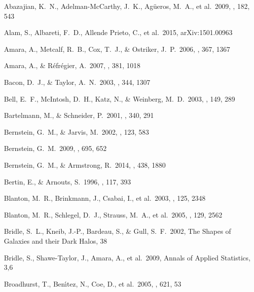 \documentclass[apj]{emulateapj}
\begin{document}
\begin{thebibliography}{}

  Abazajian, K.~N.,
 Adelman-McCarthy, J.~K., Ag{\"u}eros, M.~A., et al.\ 2009, \apjs, 182, 543

 Alam, S., Albareti, F.~D.,
Allende Prieto, C., et al.\ 2015, arXiv:1501.00963

  Amara, A., Metcalf,
  R.~B., Cox, T.~J., \& Ostriker, J.~P.\ 2006, \mnras, 367, 1367

  Amara, A., \& R{\'e}fr{\'e}gier, A.\ 2007, \mnras, 381, 1018

 Bacon, D.~J., \& Taylor, A.~N.\ 2003, \mnras, 344, 1307

  Bell, E.~F., McIntosh,
D.~H., Katz, N., \& Weinberg, M.~D.\ 2003, \apjs, 149, 289

  Bartelmann, M., \& Schneider, P.\ 2001, \physrep, 340, 291

   Bernstein, G.~M., \& Jarvis, M.\ 2002, \aj, 123, 583

  Bernstein, G.~M.\ 2009,
   \apj, 695, 652

  Bernstein, G.~M., \& Armstrong, R.\ 2014, \mnras, 438, 1880

 Bertin, E., \& Arnouts, S.\ 1996, \aaps, 117, 393

 Blanton, M.~R.,
Brinkmann, J., Csabai, I., et al.\ 2003, \aj, 125, 2348


  Blanton, M.~R.,
   Schlegel, D.~J., Strauss, M.~A., et al.\ 2005, \aj, 129, 2562


  Bridle, S.~L., Kneib,
J.-P., Bardeau, S.,
\& Gull, S.~F.\ 2002, The Shapes of Galaxies and their Dark Halos, 38

  Bridle, S.,
Shawe-Taylor, J., Amara, A., et al.\ 2009, Annals of Applied Statistics, 3,6

  Broadhurst, T.,
  Ben{\'{\i}}tez, N., Coe, D., et al.\ 2005, \apj, 621, 53



\end{thebibliography}
\end{document}
